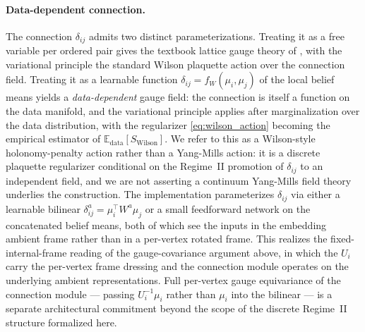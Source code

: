 \documentclass[11pt]{article}
\begin{document}
\paragraph{Data-dependent connection.} The connection $\delta_{ij}$ admits two distinct parameterizations. Treating it as a free variable per ordered pair gives the textbook lattice gauge theory of \cite{WilsonConfinement1974, KogutSusskind1975}, with the variational principle the standard Wilson plaquette action over the connection field. Treating it as a learnable function $\delta_{ij} = f_W(\mu_i, \mu_j)$ of the local belief means yields a \emph{data-dependent} gauge field: the connection is itself a function on the data manifold, and the variational principle applies after marginalization over the data distribution, with the regularizer \eqref{eq:wilson_action} becoming the empirical estimator of $\mathbb{E}_{\mathrm{data}}[S_{\mathrm{Wilson}}]$. We refer to this as a Wilson-style holonomy-penalty action rather than a Yang-Mills action: it is a discrete plaquette regularizer conditional on the Regime~II promotion of $\delta_{ij}$ to an independent field, and we are not asserting a continuum Yang-Mills field theory underlies the construction. The implementation parameterizes $\delta_{ij}$ via either a learnable bilinear $\delta_{ij}^a = \mu_i^\top W^a \mu_j$ or a small feedforward network on the concatenated belief means, both of which see the inputs in the embedding ambient frame rather than in a per-vertex rotated frame. This realizes the fixed-internal-frame reading of the gauge-covariance argument above, in which the $U_i$ carry the per-vertex frame dressing and the connection module operates on the underlying ambient representations. Full per-vertex gauge equivariance of the connection module — passing $U_i^{-1}\mu_i$ rather than $\mu_i$ into the bilinear — is a separate architectural commitment beyond the scope of the discrete Regime~II structure formalized here.
\end{document}
